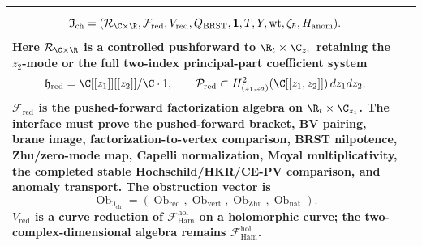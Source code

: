 \begin{longtable}{@{}>{\raggedright\arraybackslash}p{}
  >{\raggedright\arraybackslash}p{}@{}}
\[
  \mathfrak I_{\mathrm{ch}}
  =
  (\mathcal R_{\C\times\R},
   \mathcal F_{\mathrm{red}},
   V_{\mathrm{red}},
   Q_{\mathrm{BRST}},
   \mathbf 1,T,Y,
   \operatorname{wt},
   \zeta_{\hbar},
   H_{\mathrm{anom}}).
\]
Here \(\mathcal R_{\C\times\R}\) is a controlled pushforward to
\(\R_t\times\C_{z_1}\) retaining the \(z_2\)-mode or the full two-index
principal-part coefficient system
\[
  \mathfrak h_{\mathrm{red}}=\C[[z_1]][[z_2]]/\C\cdot1,\qquad
  \mathcal P_{\mathrm{red}}\subset
  H^2_{(z_1,z_2)}(\C[[z_1,z_2]])\,dz_1dz_2 .
\]
\(\mathcal F_{\mathrm{red}}\) is the pushed-forward factorization
algebra on \(\R_t\times\C_{z_1}\).  The interface must prove the
pushed-forward bracket, BV pairing, brane image, factorization-to-vertex
comparison, BRST nilpotence, Zhu/zero-mode map, Capelli normalization,
Moyal multiplicativity, the completed stable Hochschild/HKR/CE-PV
comparison, and anomaly transport.  The obstruction vector is
\[
  \operatorname{Ob}_{\mathfrak I_{\mathrm{ch}}}
  =
  (\operatorname{Ob}_{\mathrm{red}},
   \operatorname{Ob}_{\mathrm{vert}},
   \operatorname{Ob}_{\mathrm{Zhu}},
   \operatorname{Ob}_{\mathrm{nat}}).
\]
\(V_{\mathrm{red}}\) is a curve reduction of
\(\mathcal F_{\mathrm{Ham}}^{\mathrm{hol}}\) on a holomorphic curve; the
two-complex-dimensional algebra remains
\(\mathcal F_{\mathrm{Ham}}^{\mathrm{hol}}\).\\
\hline
\end{longtable}

